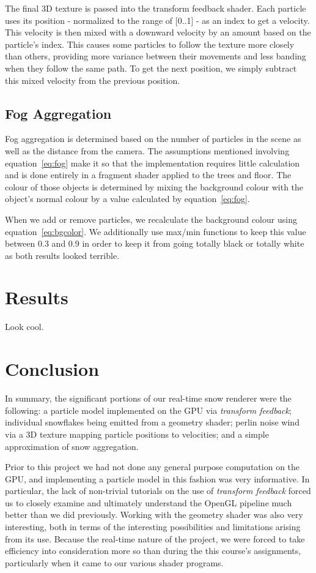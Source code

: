 \documentclass[conference]{acmsiggraph}
\begin{document}
The final 3D texture is passed into the transform feedback shader. Each particle uses its position - normalized to the range of [0..1] -  as an index to get a velocity. This velocity is then mixed with a downward velocity by an amount based on the particle's index. This causes some particles to follow the texture more closely than others, providing more variance between their movements and less banding when they follow the same path. To get the next position, we simply subtract this mixed velocity from the previous position.

\subsection{Fog Aggregation}
Fog aggregation is determined based on the number of particles in the scene as well as the distance from the camera. The assumptions mentioned involving equation~\ref{eq:fog} make it so that the implementation requires little calculation and is done entirely in a fragment shader applied to the trees and floor. The colour of those objects is determined by mixing the background colour with the object's normal colour by a value calculated by equation~\ref{eq:fog}.

When we add or remove particles, we recalculate the background colour using equation~\ref{eq:bgcolor}. We additionally use max/min functions to keep this value between 0.3 and 0.9 in order to keep it from going totally black or totally white as both results looked terrible.

\section{Results}
Look cool.

\section{Conclusion}
In summary, the significant portions of our real-time snow renderer were the following: a particle model implemented on the GPU via \textit{transform feedback}; individual snowflakes being emitted from a geometry shader; perlin noise wind via a 3D texture mapping particle positions to velocities; and a simple approximation of snow aggregation.

Prior to this project we had not done any general purpose computation on the GPU, and implementing a particle model in this fashion was very informative. In particular, the lack of non-trivial tutorials on the use of \textit{transform feedback} forced us to closely examine and ultimately understand the OpenGL pipeline much better than we did previously. Working with the geometry shader was also very interesting, both in terms of the interesting possibilities and limitations arising from its use. Because the real-time nature of the project, we were forced to take efficiency into consideration more so than during the this course's assignments, particularly when it came to our various shader programs.
\end{document}
